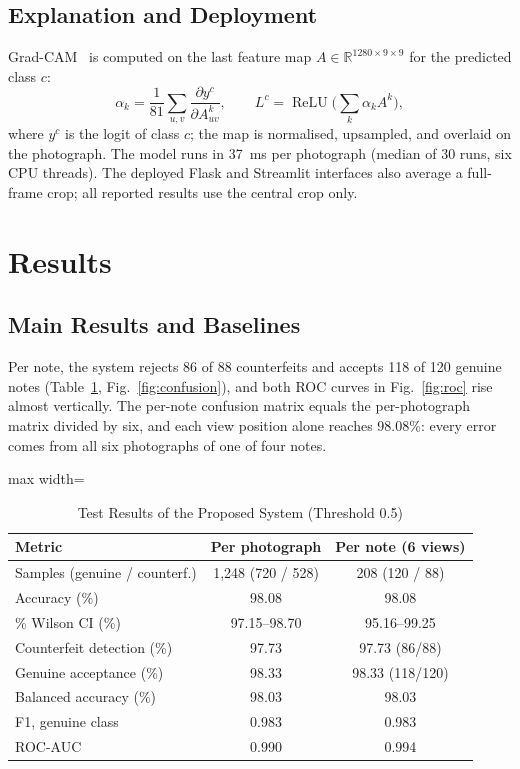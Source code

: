 \documentclass[journal]{IEEEtran}
\begin{document}
\subsection{Explanation and Deployment}
Grad-CAM~\cite{selvaraju2017gradcam} is computed on the last feature map
$A\in\mathbb{R}^{1280\times9\times9}$ for the predicted class $c$:
\begin{equation}
\alpha_k = \frac{1}{81}\sum_{u,v}\frac{\partial y^{c}}{\partial A^{k}_{uv}},\qquad
L^{c} = \operatorname{ReLU}\!\Big(\sum_{k}\alpha_k A^{k}\Big),
\label{eq:gradcam}
\end{equation}
where $y^c$ is the logit of class $c$; the map is normalised, upsampled, and overlaid on
the photograph. The model runs in 37~ms per photograph (median of 30 runs, six CPU threads). The
deployed Flask and Streamlit interfaces also average a full-frame crop; all reported
results use the central crop only.

\section{Results}
\label{sec:results}

\subsection{Main Results and Baselines}
Per note, the system rejects 86 of 88 counterfeits and accepts 118 of 120 genuine notes
(Table~\ref{tab:main}, Fig.~\ref{fig:confusion}), and both ROC curves in
Fig.~\ref{fig:roc} rise almost vertically. The per-note confusion matrix equals the per-photograph matrix
divided by six, and each view position alone reaches 98.08\%: every error comes from all
six photographs of one of four notes.

\begin{table}[!t]
\caption{Test Results of the Proposed System (Threshold 0.5)}
\label{tab:main}
\centering
\footnotesize
\setlength{\tabcolsep}{4pt}
\begin{adjustbox}{max width=\columnwidth}
\begin{tabular}{@{}lcc@{}}
\toprule
Metric & Per photograph & Per note (6 views) \\
\midrule
Samples (genuine / counterf.) & 1{,}248 (720 / 528) & 208 (120 / 88) \\
Accuracy (\%) & 98.08 & 98.08 \\
\quad 95\% Wilson CI (\%) & 97.15--98.70 & 95.16--99.25 \\
Counterfeit detection (\%) & 97.73 & 97.73 (86/88) \\
Genuine acceptance (\%) & 98.33 & 98.33 (118/120) \\
Balanced accuracy (\%) & 98.03 & 98.03 \\
F1, genuine class & 0.983 & 0.983 \\
ROC-AUC & 0.990 & 0.994 \\
\bottomrule
\end{tabular}
\end{adjustbox}
\end{table}
\end{document}
